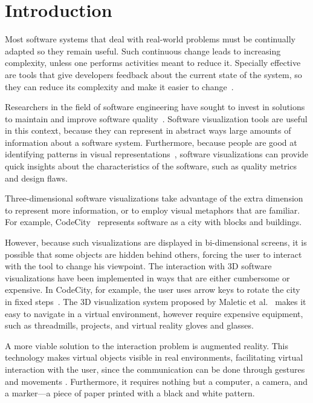 \section{Introduction} \label{sec:intro}
Most software systems that deal with real-world problems must be continually adapted so they remain useful. Such continuous change leads to increasing complexity, unless one performs activities meant to reduce it. Specially effective are tools that give developers feedback about the current state of the system, so they can reduce its complexity and make it easier to change~\cite{lehman:1980}.

Researchers in the field of software engineering have sought to invest in solutions to maintain and improve software quality~\cite{Sensalire:2008}. Software visualization tools are useful in this context, because they can represent in abstract ways large amounts of information about a software system. Furthermore, because people are good at identifying patterns in visual representations~\cite{diehl:2007}, software visualizations can provide quick insights about the characteristics of the software, such as quality metrics and design flaws.

Three-dimensional software visualizations take advantage of the extra dimension to represent more information, or to employ visual metaphors that are familiar. For example, CodeCity~\cite{wettel:2008} represents software as a city with blocks and buildings.

However, because such visualizations are displayed in bi-dimensional screens, it is possible that some objects are hidden behind others, forcing the user to interact with the tool to change his viewpoint. The interaction with 3D software visualizations have been implemented in ways that are either cumbersome or expensive. In CodeCity, for example, the user uses arrow keys to rotate the city in fixed steps~\cite{wettel:2008}. The 3D visualization system proposed by Maletic et al.~\cite{maletic:2001} makes it easy to navigate in a virtual environment, however require expensive equipment, such as threadmills, projects, and virtual reality gloves and glasses.

A more viable solution to the interaction problem is augmented reality. This technology makes virtual objects visible in real environments, facilitating virtual interaction with the user, since the communication can be done through gestures and movements \cite{azuma:1997}. Furthermore, it requires nothing but a computer, a camera, and a marker---a piece of paper printed with a black and white pattern.

